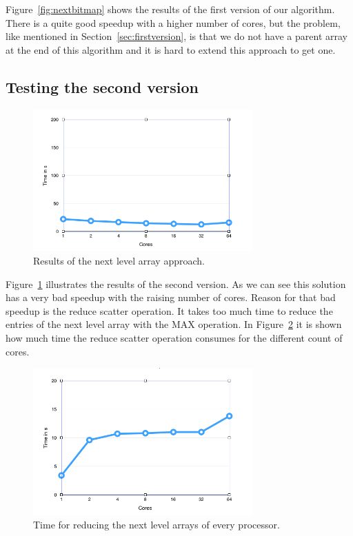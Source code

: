 \documentclass[12pt,a4paper]{article}
\begin{document}
Figure~\ref{fig:nextbitmap} shows the results of the first version of our algorithm. There is a quite good speedup with a higher number of cores, but the problem, like mentioned in Section~\ref{sec:firstversion}, is that we do not have a parent array at the end of this algorithm and it is hard to extend this approach to get one.

\subsection{Testing the second version}

\begin{figure}[!ht]
   \centering
   \includegraphics[width=0.75\textwidth]{parent_array}
   \caption{Results of the next level array approach.}
   \label{fig:parentarray}
\end{figure}

Figure~\ref{fig:parentarray} illustrates the results of the second version. As we can see this solution has a very bad speedup with the raising number of cores. Reason for that bad speedup is the reduce scatter operation. It takes too much time to reduce the entries of the next level array with the MAX operation. In Figure~\ref{fig:reducescatter} it is shown how much time the reduce scatter operation consumes for the different count of cores.

\begin{figure}[H]
   \centering
   \includegraphics[width=0.75\textwidth]{reducescatter}
   \caption{Time for reducing the next level arrays of every processor.}
   \label{fig:reducescatter}
\end{figure}
\end{document}
